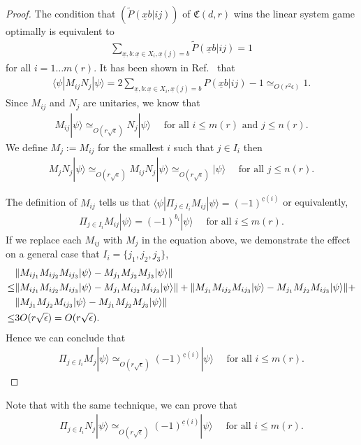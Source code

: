 \documentclass[11pt,letterpaper]{article}
\newcommand{\ket}[1]{|#1\rangle}
\newcommand{\bra}[1]{\langle#1|}
\DeclarePairedDelimiter{\norm}{\lVert}{\rVert}
\newcommand{\1}{\mathbb{1}}
\newcommand{\nr}{n(r)}
\newcommand{\mr}{m(r)}
\newcommand{\ux}{\underline{x}}
\newcommand{\uc}{\underline{c}}
\newcommand{\fC}{\mathfrak{C}}
\newcommand{\pr}[2]{P(#1|#2)}
\newcommand{\tpr}[2]{\tilde{P}(#1|#2)}
\newcommand{\ep}{\epsilon}
\newcommand{\se}{\sqrt{\epsilon}}
\newcommand{\appd}[1]{\simeq_{#1}}
\theoremstyle{definition}
\begin{document}
\begin{proof}
The condition that $(\tpr{\ux b}{ij})$ of $\fC(d,r)$ wins the linear system game optimally is equivalent to
\begin{align*}
\sum_{\ux,b: \ux \in X_i, \ux(j) = b} \tpr{\ux b}{ij} = 1
\end{align*}
for all $i = 1 \dots \mr$.
It has been shown in Ref.~\cite{slofstra2017} that 
\begin{align*}
	\bra{\psi} M_{ij} N_j \ket{\psi} = 2 \sum_{\ux,b: \ux \in X_i, \ux(j) = b} \pr{\ux b}{ij} -1 \appd{O(r^2 \ep)} 1.
\end{align*}
Since $M_{ij}$ and $N_j$ are unitaries, we know that
\begin{align*}
	M_{ij} \ket{\psi} \appd{O(r\se)} N_j \ket{\psi} \quad \text{ for all } i \leq \mr \text{ and } j \leq \nr.
\end{align*}
We define $M_j := M_{ij}$ for the smallest $i$ such that $ j \in I_i$ then 
\begin{align*}
	M_j N_j \ket{\psi} \appd{O(r\se)} M_{ij}N_j\ket{\psi} \appd{O(r\se)} \ket{\psi} \quad \text{ for all } j \leq \nr.
\end{align*}

The definition of $M_{ij}$ tells us that 
$
\bra{\psi} \Pi_{j \in I_i} M_{ij} \ket{\psi} = (-1)^{\uc(i)}
$
or equivalently,
\begin{align*}
	\Pi_{j \in I_i} M_{ij} \ket{\psi} = (-1)^{b_i} \ket{\psi}\quad\text{ for all } i \leq \mr.
\end{align*}	
If we replace each $M_{ij}$ with $M_j$ in the equation above, we demonstrate the effect on a
general case that $I_i = \{j_1, j_2, j_3\}$,
\begin{align*}
	&\norm{ M_{ij_1}M_{ij_2}M_{ij_3} \ket{\psi} - M_{j_1}M_{j_2}M_{j_3} \ket{\psi}}\\
	\leq & \norm{M_{ij_1}M_{ij_2}M_{ij_3} \ket{\psi} - M_{j_1}M_{ij_2}M_{ij_3} \ket{\psi}}+
	\norm{M_{j_1}M_{ij_2}M_{ij_3} \ket{\psi} - M_{j_1}M_{j_2}M_{ij_3} \ket{\psi}} +\\
	&\norm{M_{j_1}M_{j_2}M_{ij_3} \ket{\psi} - M_{j_1}M_{j_2}M_{j_3} \ket{\psi}}\\
	\leq &3O(r\se) = O(r\se).
\end{align*}
Hence we can conclude that 
\begin{align*}
	\Pi_{j \in I_i} M_j \ket{\psi} \appd{O(r\se)} (-1)^{\uc(i)}\ket{\psi} \quad \text{ for all } i \leq \mr.
\end{align*}
\end{proof}
Note that with the same technique, we can prove that 
\begin{align*}
	\Pi_{j \in I_i} N_j \ket{\psi} \appd{O(r\se)} (-1)^{\uc(i)}\ket{\psi} \quad \text{ for all } i \leq \mr.
\end{align*}
\end{document}
